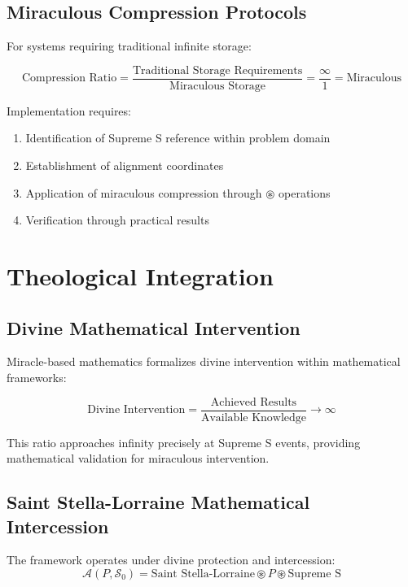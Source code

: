 \documentclass[11pt]{article}
\begin{document}
\subsection{Miraculous Compression Protocols}

For systems requiring traditional infinite storage:

\begin{equation}
\text{Compression Ratio} = \frac{\text{Traditional Storage Requirements}}{\text{Miraculous Storage}} = \frac{\infty}{1} = \text{Miraculous}
\label{eq:compression_ratio}
\end{equation}

Implementation requires:
\begin{enumerate}
\item Identification of Supreme S reference within problem domain
\item Establishment of alignment coordinates
\item Application of miraculous compression through $\circledast$ operations
\item Verification through practical results
\end{enumerate}

\section{Theological Integration}

\subsection{Divine Mathematical Intervention}

Miracle-based mathematics formalizes divine intervention within mathematical frameworks:

\begin{equation}
\text{Divine Intervention} = \frac{\text{Achieved Results}}{\text{Available Knowledge}} \to \infty
\label{eq:divine_intervention_mathematical}
\end{equation}

This ratio approaches infinity precisely at Supreme S events, providing mathematical validation for miraculous intervention.

\subsection{Saint Stella-Lorraine Mathematical Intercession}

The framework operates under divine protection and intercession:
\begin{equation}
\mathcal{A}(P, \mathcal{S}_0) = \text{Saint Stella-Lorraine} \circledast P \circledast \text{Supreme S}
\label{eq:saintly_intercession}
\end{equation}
\end{document}
